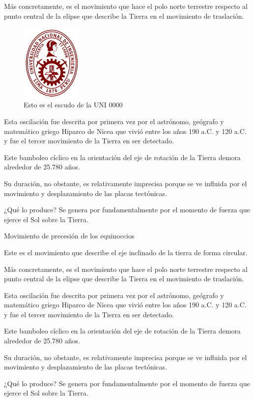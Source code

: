 \documentclass[12pt,a4paper]{article}
\begin{document}
Más concretamente, es el movimiento que hace el polo norte terrestre respecto al punto central de la elipse 
que describe la Tierra en el movimiento de traslación.

\begin{figure}[H]
	\centering
	\includegraphics[width=3cm]{uni}
	\caption{Esto es el escudo de la UNI 0000}\label{fig1}
\end{figure}

Esta oscilación fue descrita por primera vez por el astrónomo, geógrafo y matemático griego Hiparco de Nicea 
que vivió entre los años 190 a.C. y 120 a.C. y fue el tercer movimiento de la Tierra en ser detectado.

Este bamboleo cíclico en la orientación del eje de rotación de la Tierra demora alrededor de 25.780 años. 

Su duración, no obstante, es relativamente imprecisa porque se ve influida por el movimiento y desplazamiento 
de las placas tectónicas.

¿Qué lo produce? Se genera por fundamentalmente por el momento de fuerza que ejerce el Sol sobre la Tierra.

Movimiento de precesión de los equinoccios

Este es el movimiento que describe el eje inclinado de la tierra de forma circular.

Más concretamente, es el movimiento que hace el polo norte terrestre respecto al punto central de la elipse 
que describe la Tierra en el movimiento de traslación.

Esta oscilación fue descrita por primera vez por el astrónomo, geógrafo y matemático griego Hiparco de Nicea 
que vivió entre los años 190 a.C. y 120 a.C. y fue el tercer movimiento de la Tierra en ser detectado.

Este bamboleo cíclico en la orientación del eje de rotación de la Tierra demora alrededor de 25.780 años. 

Su duración, no obstante, es relativamente imprecisa porque se ve influida por el movimiento y desplazamiento 
de las placas tectónicas.

¿Qué lo produce? Se genera por fundamentalmente por el momento de fuerza que ejerce el Sol sobre la Tierra.
\end{document}
